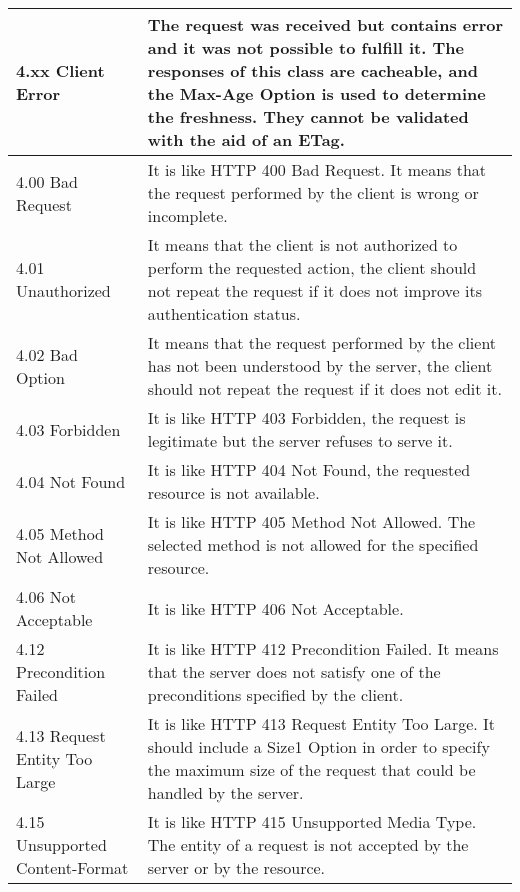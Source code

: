 \begin{longtable}{|l|X|}
\textbf{4.xx Client Error} & The request was received but contains error and it was not possible to fulfill it.
The responses of this class are cacheable, and the Max-Age Option is used to determine the freshness.
They cannot be validated with the aid of an ETag.\\\hline

4.00 Bad Request & It is like HTTP 400 Bad Request.
It means that the request performed by the client is wrong or incomplete.\\\hline

4.01 Unauthorized & It means that the client is not authorized to perform the requested action, the client should not repeat the request if it does not improve its authentication status.\\\hline

4.02 Bad Option & It means that the request performed by the client has not been understood by the server, the client should not repeat the request if it does not edit it.\\\hline

4.03 Forbidden & It is like HTTP 403 Forbidden, the request is legitimate but the server refuses to serve it.\\\hline

4.04 Not Found & It is like HTTP 404 Not Found, the requested resource is not available.\\\hline

4.05 Method Not Allowed &	It is like HTTP 405 Method Not Allowed.
The selected method is not allowed for the specified resource.\\\hline

4.06 Not Acceptable & It is like HTTP 406 Not Acceptable.\\\hline

4.12 Precondition Failed & It is like HTTP 412 Precondition Failed.
It means that the server does not satisfy one of the preconditions specified by the client.\\\hline

4.13  Request Entity Too Large & It is like HTTP 413 Request Entity Too Large.
It should include a Size1 Option in order to specify the maximum size of the request that could be handled by the server.\\\hline

4.15 Unsupported Content-Format & It is like HTTP 415 Unsupported Media Type.
The entity of a request is not accepted by the server or by the resource.\\\hline


\end{longtable}
